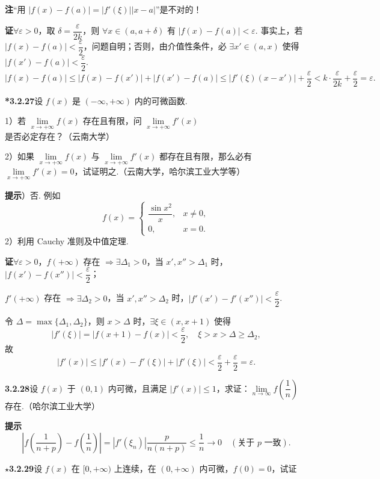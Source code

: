 \documentclass[UTF8,12pt,a4paper,fontset=fandol]{ctexart}
\begin{document}
\noindent\textbf{注}\quad “用 $|f(x)-f(a)|=|f'(\xi)||x-a|$”是不对的！

\noindent\textbf{证}\quad $\forall \varepsilon>0$，取 $\delta=\dfrac{\varepsilon}{2k}$，则 $\forall x\in(a,a+\delta)$ 有 $|f(x)-f(a)|<\varepsilon$. 事实上，若 $|f(x)-f(a)|<\dfrac{\varepsilon}{2}$，问题自明；否则，由介值性条件，必 $\exists x'\in(a,x)$ 使得 $|f(x')-f(a)|<\dfrac{\varepsilon}{2}$.
\[
  |f(x)-f(a)|
  \le |f(x)-f(x')|+|f(x')-f(a)|
  \le |f'(\xi)(x-x')|+\frac{\varepsilon}{2}
  < k\cdot\frac{\varepsilon}{2k}+\frac{\varepsilon}{2}
  =\varepsilon.
\]

\noindent\textbf{*3.2.27}\quad 设 $f(x)$ 是 $(-\infty,+\infty)$ 内的可微函数.

1）若 $\lim\limits_{x\to+\infty} f(x)$ 存在且有限，问 $\lim\limits_{x\to+\infty} f'(x)$ 是否必定存在？（云南大学）

2）如果 $\lim\limits_{x\to+\infty} f(x)$ 与 $\lim\limits_{x\to+\infty} f'(x)$ 都存在且有限，那么必有 $\lim\limits_{x\to+\infty} f'(x)=0$，试证明之.（云南大学，哈尔滨工业大学等）

\noindent\textbf{提示}）否. 例如
\[
  f(x)=
  \begin{cases}
    \dfrac{\sin x^2}{x},& x\ne0,\\
    0,& x=0.
  \end{cases}
\]
2）利用 Cauchy 准则及中值定理.

\noindent\textbf{证}\quad $\forall\varepsilon>0$，$f(+\infty)$ 存在 $\Rightarrow\exists\Delta_1>0$，当 $x',x''>\Delta_1$ 时，$|f(x')-f(x'')|<\dfrac{\varepsilon}{2}$；

$f'(+\infty)$ 存在 $\Rightarrow\exists\Delta_2>0$，当 $x',x''>\Delta_2$ 时，$|f'(x')-f'(x'')|<\dfrac{\varepsilon}{2}$.

令 $\Delta=\max\{\Delta_1,\Delta_2\}$，则 $x>\Delta$ 时，$\exists \xi\in(x,x+1)$ 使得
\[
  |f'(\xi)|=|f(x+1)-f(x)|<\frac{\varepsilon}{2},\quad \xi>x>\Delta\ge\Delta_2,
\]
故
\[
  |f'(x)|\le |f'(x)-f'(\xi)|+|f'(\xi)|<\frac{\varepsilon}{2}+\frac{\varepsilon}{2}=\varepsilon.
\]

\noindent\textbf{3.2.28}\quad 设 $f(x)$ 于 $(0,1)$ 内可微，且满足 $|f'(x)|\le1$，求证：$\lim\limits_{n\to\infty}f\left(\dfrac1n\right)$ 存在.（哈尔滨工业大学）

\noindent\textbf{提示}\quad
\[
  \left|f\left(\frac1{n+p}\right)-f\left(\frac1n\right)\right|
  =|f'(\xi_n)|\frac{p}{n(n+p)}
  \le\frac1n\to0\quad(\text{关于 }p\text{ 一致}).
\]

\noindent\textbf{$\star$3.2.29}\quad 设 $f(x)$ 在 $[0,+\infty)$ 上连续，在 $(0,+\infty)$ 内可微，$f(0)=0$，试证
\end{document}
